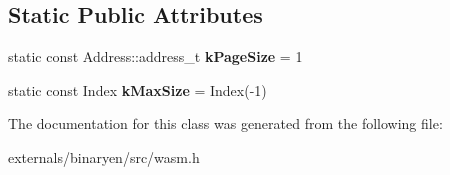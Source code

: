\subsection*{Static Public Attributes}
\begin{DoxyCompactItemize}
\item 
\mbox{\label{classwasm_1_1_table_acaaf6c52c73ebcdf79d1f209df71443b}} 
static const Address\+::address\+\_\+t {\bfseries k\+Page\+Size} = 1
\item 
\mbox{\label{classwasm_1_1_table_aaf788aa9582b79998c9190bd63f37384}} 
static const Index {\bfseries k\+Max\+Size} = Index(-\/1)
\end{DoxyCompactItemize}


The documentation for this class was generated from the following file\+:\begin{DoxyCompactItemize}
\item 
externals/binaryen/src/wasm.\+h\end{DoxyCompactItemize}
